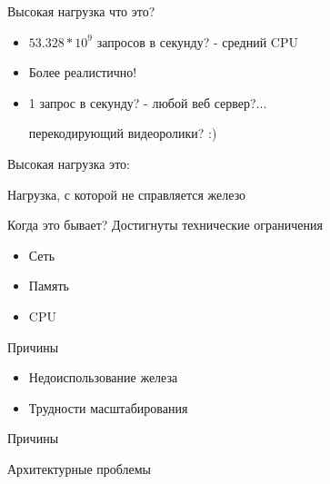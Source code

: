 \documentclass[aspectratio=169]{beamer}
\begin{document}
\begin{frame}{Высокая нагрузка что это?}
    \begin{itemize}
        
        \pause
        \item $53.328 * 10^9$  запросов в секунду?
            \pause
            {\small - средний CPU}

        \pause
        \item Более реалистично!

        \pause
        \item 1 запрос в секунду?
            \pause
            - любой веб сервер?...
            \pause
            \par {\small перекодирующий видеоролики? :)}
    \end{itemize}
\end{frame}

\begin{frame}{Высокая нагрузка это:}
    \pause
    \begin{center}
        {\huge Нагрузка, с которой не справляется железо}
    \end{center}
\end{frame}

\begin{frame}{Когда это бывает?}
    \pause
    {\large Достигнуты технические ограничения}
    \begin{itemize}
        \pause
        \item Сеть
        
        \pause
        \item Память
        
        \pause
        \item CPU
    \end{itemize}
\end{frame}

\begin{frame}{Причины}
    \begin{itemize}
        \pause
        \item Недоиспользование железа

        \pause
        \item Трудности масштабирования
    \end{itemize}

\end{frame}

\begin{frame}{Причины}
    \begin{block}
        {\huge Архитектурные проблемы}
    \end{block}
\end{frame}
\end{document}
